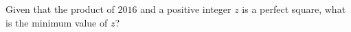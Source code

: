 Given that the product of $2016$ and a positive integer $z$ is a perfect square, what is the minimum value of $z$?
